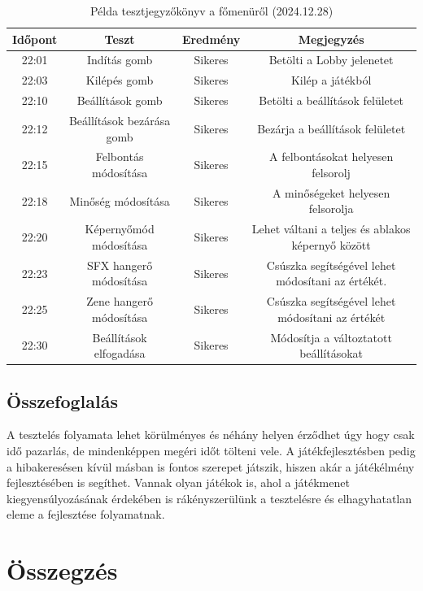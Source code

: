 \documentclass[]{thesis-ekf}
\theoremstyle{definition}
\theoremstyle{remark}
\begin{document}
\begin{table}[ht!]
	\centering
	\footnotesize
	\begin{tabular}{|c|c|c|c|}
		\hline
		\textbf{Időpont} & \textbf{Teszt} & \textbf{Eredmény} & \textbf{Megjegyzés} \\
		\hline
		22:01 & Indítás gomb & Sikeres & Betölti a Lobby jelenetet \\
        \hline
		22:03 & Kilépés gomb & Sikeres & Kilép a játékból \\
		\hline
		22:10 & Beállítások gomb & Sikeres & Betölti a beállítások felületet \\
		\hline
		22:12 & Beállítások bezárása gomb & Sikeres & Bezárja a beállítások felületet \\
		\hline
		22:15 & Felbontás módosítása & Sikeres & A felbontásokat helyesen felsorolj \\
		\hline
		22:18 & Minőség módosítása & Sikeres & A minőségeket helyesen felsorolja \\
		\hline
		22:20 & Képernyőmód módosítása & Sikeres & Lehet váltani a teljes és ablakos képernyő között \\
		\hline
		22:23 & SFX hangerő módosítása & Sikeres & Csúszka segítségével lehet módosítani az értékét. \\
		\hline
		22:25 & Zene hangerő módosítása & Sikeres & Csúszka segítségével lehet módosítani az értékét \\
		\hline
		22:30 & Beállítások elfogadása & Sikeres & Módosítja a változtatott beállításokat \\
		\hline
	\end{tabular}
	\caption{Példa tesztjegyzőkönyv a főmenüről (2024.12.28)}
	\label{tab-tesztjegyzokonyv}
\end{table}

\section{Összefoglalás}

A tesztelés folyamata lehet körülményes és néhány helyen érződhet úgy hogy csak idő pazarlás, de mindenképpen megéri időt tölteni vele. A játékfejlesztésben pedig a hibakeresésen kívül másban is fontos szerepet játszik, hiszen akár a játékélmény fejlesztésében is segíthet. Vannak olyan játékok is, ahol a játékmenet kiegyensúlyozásának érdekében is rákényszerülünk a tesztelésre és elhagyhatatlan eleme a fejlesztése folyamatnak.

\chapter*{Összegzés}
\end{document}
